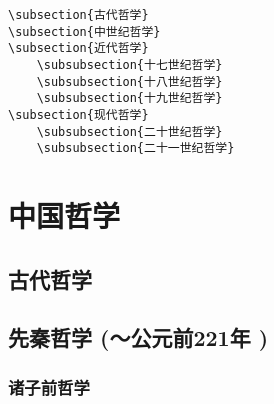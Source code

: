 \documentclass[UTF8]{../RepresentationUniverse}
\begin{document}
\begin{lstlisting}
\subsection{古代哲学}
\subsection{中世纪哲学}
\subsection{近代哲学}
    \subsubsection{十七世纪哲学}
    \subsubsection{十八世纪哲学}
    \subsubsection{十九世纪哲学}
\subsection{现代哲学}
    \subsubsection{二十世纪哲学}
    \subsubsection{二十一世纪哲学}
\end{lstlisting}





\section{中国哲学}
        
\subsection{古代哲学}

\subsection{先秦哲学 (～公元前221年 )}
    \subsubsection{诸子前哲学}
    
\end{document}
